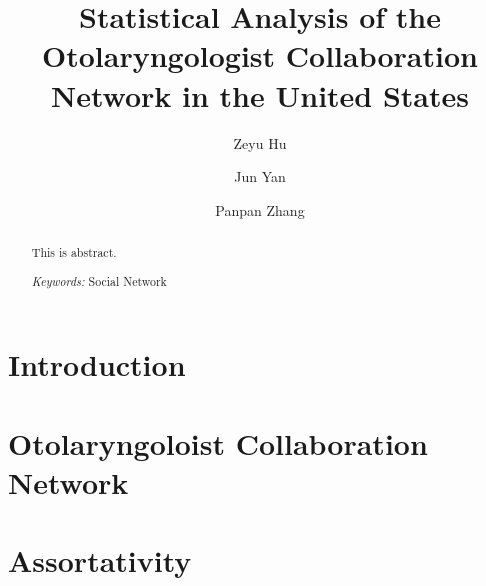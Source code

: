 \documentclass[titlepage, 12pt]{article}
\begin{document}
	
	\title{Statistical Analysis of the Otolaryngologist 
	Collaboration Network in the United States}
	
	\author[1]{Zeyu Hu}
	\author[1]{Jun Yan}
	
	\author[2]{Panpan Zhang}
		
	\maketitle
	
	\begin{abstract}
		This is abstract.
		
		\bigskip
		\noindent%
		{\it Keywords:\/} Social Network
		
	\end{abstract}
	
	\doublespacing
	
	\section{Introduction}
	\label{sec:intr}
	
	\section{Otolaryngoloist Collaboration Network}
	\label{sec:otonet}
	
	\section{Assortativity}
	\label{sec:assort}
	


	
\end{document}
